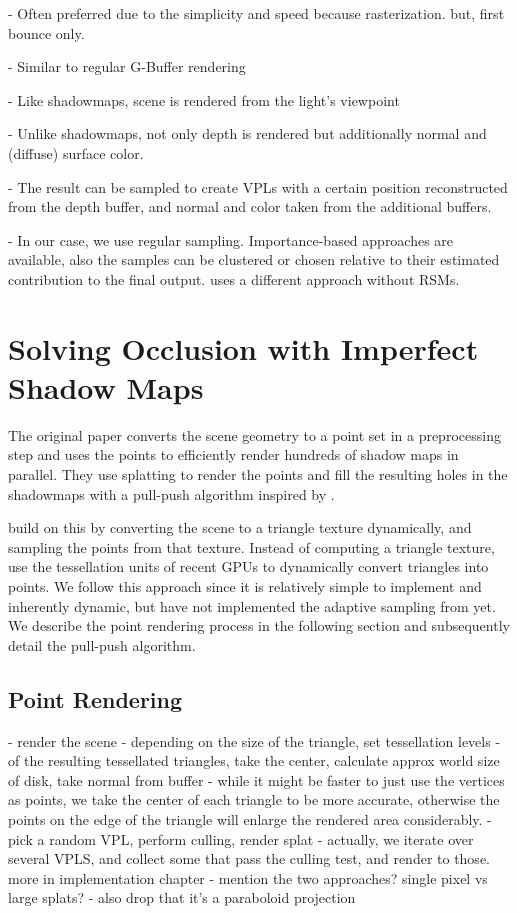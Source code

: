 - Often preferred due to the simplicity and speed because rasterization. but, first bounce only.

- Similar to regular G-Buffer rendering

- Like shadowmaps, scene is rendered from the light's viewpoint

- Unlike shadowmaps, not only depth is rendered but additionally normal and (diffuse) surface color.

- The result can be sampled to create VPLs with a certain position reconstructed from the depth buffer, and normal and color taken from the additional buffers.

- In our case, we use regular sampling. Importance-based approaches are available, also the samples can be clustered \cite{} or chosen relative to their estimated contribution to the final output. \citet{hedman2016sequential} uses a different approach without RSMs.


\section{Solving Occlusion with Imperfect Shadow Maps}
\label{sec:ISM}


The original paper \citep{ritschel2008ism} converts the scene geometry to a point set in a preprocessing step and uses the points to efficiently render hundreds of shadow maps in parallel. They use splatting to render the points and fill the resulting holes in the shadowmaps with a pull-push algorithm inspired by \citep{Marroquim:2007:reconstruction}.

\citet{ritschel2011ismsViewAdaptive} build on \citet{laine2007incremental} this by converting the scene to a triangle texture dynamically, and sampling the points from that texture. Instead of computing a triangle texture, \citet{barak2013temporally} use the tessellation units of recent GPUs to dynamically convert triangles into points. We follow this approach since it is relatively simple to implement and inherently dynamic, but have not implemented the adaptive sampling from \citet{ritschel2011ismsViewAdaptive} yet.
We describe the point rendering process in the following section and subsequently detail the pull-push algorithm.

\subsection{Point Rendering}

- render the scene
- depending on the size of the triangle, set tessellation levels
- of the resulting tessellated triangles, take the center, calculate approx world size of disk, take normal from buffer
- while it might be faster to just use the vertices as points, we take the center of each triangle to be more accurate, otherwise the points on the edge of the triangle will enlarge the rendered area considerably.
- pick a random VPL, perform culling, render splat
- actually, we iterate over several VPLS, and collect some that pass the culling test, and render to those. more in implementation chapter
- mention the two approaches? single pixel vs large splats?
- also drop that it's a paraboloid projection

